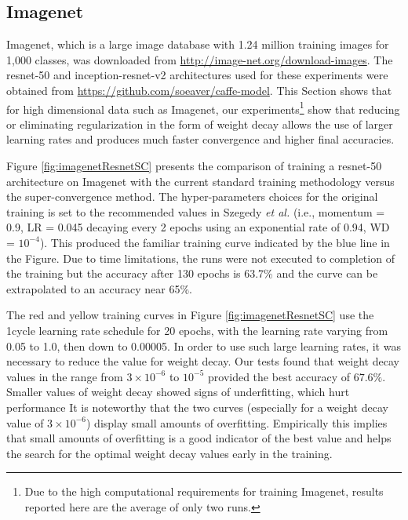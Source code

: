 \documentclass{article} %
\newcommand{\etal}{\emph{et al. }}
\begin{document}

\subsection{Imagenet}
\label{sec:imagenet}

Imagenet, which is a large image database with 1.24 million training images for 1,000 classes, was downloaded from \url{http://image-net.org/download-images}.  The resnet-50 and inception-resnet-v2 architectures used for these experiments were obtained from \url{https://github.com/soeaver/caffe-model}.  
This Section shows that for high dimensional data such as Imagenet, our experiments\footnote{Due to the high computational requirements for training Imagenet, results reported here are the average of only two runs.} show that reducing or eliminating regularization in the form of weight decay allows the use of larger learning rates and produces much faster convergence and higher final accuracies.  

Figure \ref{fig:imagenetResnetSC} presents the comparison of training a resnet-50 architecture on Imagenet with the current standard training methodology versus the super-convergence method.  The hyper-parameters choices for the original training is set to the recommended values in Szegedy \etal \cite{szegedy2017inception} (i.e., momentum = 0.9, LR = 0.045 decaying every 2 epochs using an exponential rate of 0.94, WD = $10^{-4}$).  This produced the familiar training curve indicated by the blue line in the Figure.    Due to time limitations, the runs were not executed to completion of the training but the accuracy after 130 epochs is 63.7\% and the curve can be extrapolated to an accuracy near 65\%.

The red and yellow training curves in Figure \ref{fig:imagenetResnetSC} use the 1cycle learning rate schedule for 20 epochs, with the learning rate varying from 0.05 to 1.0, then down to 0.00005.  In order to use such large learning rates, it was necessary to reduce the value for weight decay.  Our tests found that weight decay values in the range from $3 \times 10^{-6}$ to $10^{-5}$ provided the best accuracy of $67.6\%$. Smaller values of weight decay showed signs of underfitting, which hurt performance  It is noteworthy that the two curves (especially for a weight decay value of $3 \times 10^{-6}$) display small amounts of overfitting.  Empirically this implies that small amounts of overfitting is a good indicator of the best value and helps the search for the optimal weight decay values early in the training.
\end{document}
